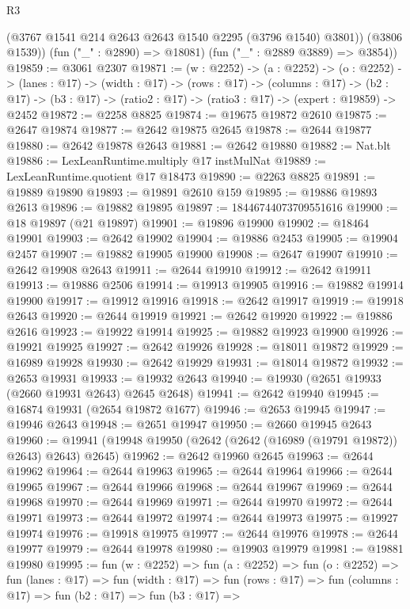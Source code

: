 \begin{lexlean}{R3}
\begin{coremodule}
          (@3767 @1541 @214 @2643 @2643 @1540 @2295 (@3796 @1540) @3801))
        (@3806 @1539))
      (fun ("_" : @2890) => @18081)
      (fun ("_" : @2889 @3889) => @3854))
@19859 := @3061 @2307
@19871 := (w : @2252) ->
  (a : @2252) ->
  (o : @2252) ->
  (lanes : @17) ->
  (width : @17) ->
  (rows : @17) ->
  (columns : @17) ->
  (b2 : @17) -> (b3 : @17) -> (ratio2 : @17) -> (ratio3 : @17) -> (expert : @19859) -> @2452
@19872 := @2258 @8825
@19874 := @19675 @19872 @2610
@19875 := @2647 @19874
@19877 := @2642 @19875 @2645
@19878 := @2644 @19877
@19880 := @2642 @19878 @2643
@19881 := @2642 @19880
@19882 := Nat.blt
@19886 := LexLeanRuntime.multiply @17 instMulNat
@19889 := LexLeanRuntime.quotient @17 @18473
@19890 := @2263 @8825
@19891 := @19889 @19890
@19893 := @19891 @2610 @159
@19895 := @19886 @19893 @2613
@19896 := @19882 @19895
@19897 := 18446744073709551616
@19900 := @18 @19897 (@21 @19897)
@19901 := @19896 @19900
@19902 := @18464 @19901
@19903 := @2642 @19902
@19904 := @19886 @2453
@19905 := @19904 @2457
@19907 := @19882 @19905 @19900
@19908 := @2647 @19907
@19910 := @2642 @19908 @2643
@19911 := @2644 @19910
@19912 := @2642 @19911
@19913 := @19886 @2506
@19914 := @19913 @19905
@19916 := @19882 @19914 @19900
@19917 := @19912 @19916
@19918 := @2642 @19917
@19919 := @19918 @2643
@19920 := @2644 @19919
@19921 := @2642 @19920
@19922 := @19886 @2616
@19923 := @19922 @19914
@19925 := @19882 @19923 @19900
@19926 := @19921 @19925
@19927 := @2642 @19926
@19928 := @18011 @19872
@19929 := @16989 @19928
@19930 := @2642 @19929
@19931 := @18014 @19872
@19932 := @2653 @19931
@19933 := @19932 @2643
@19940 := @19930 (@2651 @19933 (@2660 @19931 @2643) @2645 @2648)
@19941 := @2642 @19940
@19945 := @16874 @19931 (@2654 @19872 @1677)
@19946 := @2653 @19945
@19947 := @19946 @2643
@19948 := @2651 @19947
@19950 := @2660 @19945 @2643
@19960 := @19941 (@19948 @19950 (@2642 (@2642 (@16989 (@19791 @19872)) @2643) @2643) @2645)
@19962 := @2642 @19960 @2645
@19963 := @2644 @19962
@19964 := @2644 @19963
@19965 := @2644 @19964
@19966 := @2644 @19965
@19967 := @2644 @19966
@19968 := @2644 @19967
@19969 := @2644 @19968
@19970 := @2644 @19969
@19971 := @2644 @19970
@19972 := @2644 @19971
@19973 := @2644 @19972
@19974 := @2644 @19973
@19975 := @19927 @19974
@19976 := @19918 @19975
@19977 := @2644 @19976
@19978 := @2644 @19977
@19979 := @2644 @19978
@19980 := @19903 @19979
@19981 := @19881 @19980
@19995 := fun (w : @2252) =>
  fun (a : @2252) =>
  fun (o : @2252) =>
  fun (lanes : @17) =>
  fun (width : @17) =>
  fun (rows : @17) =>
  fun (columns : @17) =>
  fun (b2 : @17) =>
  fun (b3 : @17) =>

\end{coremodule}
\end{lexlean}
